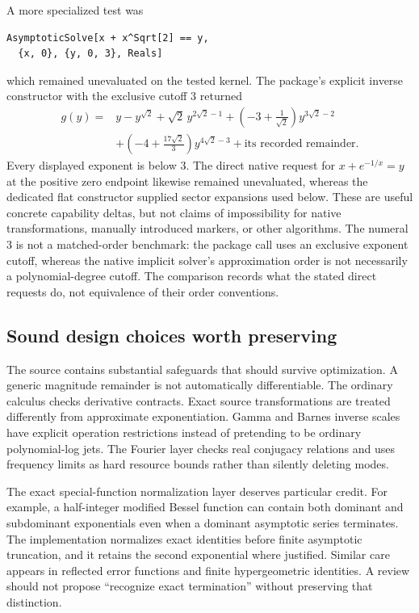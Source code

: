 \documentclass[11pt,letterpaper]{article}
\begin{document}
A more specialized test was
\begin{lstlisting}
AsymptoticSolve[x + x^Sqrt[2] == y,
  {x, 0}, {y, 0, 3}, Reals]
\end{lstlisting}
which remained unevaluated on the tested kernel. The package's explicit
inverse constructor with the exclusive cutoff 3 returned
\begin{align*}
 g(y)={}&y-y^{\sqrt2}+\sqrt2\,y^{2\sqrt2-1}
 +\left(-3+\frac1{\sqrt2}\right)y^{3\sqrt2-2}\\
 &+\left(-4+\frac{17\sqrt2}{3}\right)y^{4\sqrt2-3}
 +\text{its recorded remainder}.
\end{align*}
Every displayed exponent is below 3. The direct native request for
$x+e^{-1/x}=y$ at the positive zero endpoint likewise remained unevaluated,
whereas the dedicated flat constructor supplied sector expansions used below.
These are useful concrete capability deltas, but not claims of impossibility
for native transformations, manually introduced markers, or other algorithms.
The numeral 3 is not a matched-order benchmark: the package call uses an
exclusive exponent cutoff, whereas the native implicit solver's approximation
order is not necessarily a polynomial-degree cutoff. The comparison records
what the stated direct requests do, not equivalence of their order conventions.

\subsection{Sound design choices worth preserving}
The source contains substantial safeguards that should survive optimization.
A generic magnitude remainder is not automatically differentiable. The ordinary
calculus checks derivative contracts. Exact source transformations are treated
differently from approximate exponentiation. Gamma and Barnes inverse scales
have explicit operation restrictions instead of pretending to be ordinary
polynomial-log jets. The Fourier layer checks real conjugacy relations and
uses frequency limits as hard resource bounds rather than silently deleting
modes.\cite{seriesops,coordinates,gammaops,fourier}

The exact special-function normalization layer deserves particular credit.
For example, a half-integer modified Bessel function can contain both dominant
and subdominant exponentials even when a dominant asymptotic series terminates.
The implementation normalizes exact identities before finite asymptotic
truncation, and it retains the second exponential where justified. Similar
care appears in reflected error functions and finite hypergeometric identities.
A review should not propose ``recognize exact termination'' without preserving
that distinction.\cite{identities}
\end{document}

